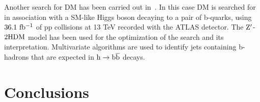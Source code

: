 \documentclass[10pt]{article}
\def\Acknowledgements{\bigskip  \bigskip \begin{center} \begin{large}
             \bf ACKNOWLEDGEMENTS \end{large}\end{center}}
\begin{document}
Another search for DM has been carried out in~\cite{ATLAS-bb-BSM}. In this case
DM is searched for in association with a SM-like Higgs boson decaying to a pair
of b-quarks, using $36.1~{\rm fb^{-1}}$ of pp collisions at 13 TeV recorded with
the ATLAS detector. The ${\rm Z'}$-${\rm 2HDM}$ model has been used for the
optimization of the search and its interpretation. Multivariate algorithms are
used to identify jets containing b-hadrons that are expected in
${\rm h}\to{\rm b{\bar b}}$ decays.


\section{Conclusions}


\end{document}
